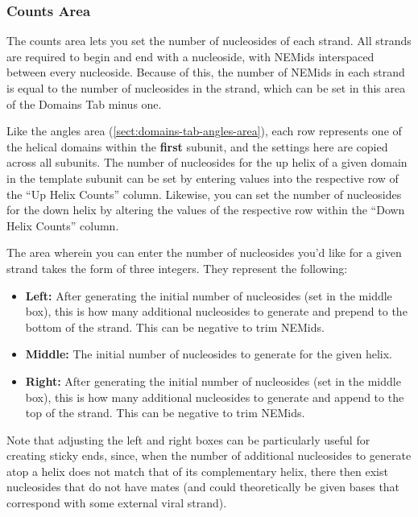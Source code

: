 \documentclass[titlepage]{article}
\begin{document}
\subsubsection{Counts Area}
\label{sect:domains-tab-counts-area}

The counts area lets you set the number of nucleosides of each strand. All strands are required to begin and end with a nucleoside, with NEMids interspaced between every nucleoside. Because of this, the number of NEMids in each strand is equal to the number of nucleosides in the strand, which can be set in this area of the Domains Tab minus one. 

Like the angles area (\ref{sect:domains-tab-angles-area}), each row represents one of the helical domains within the \textbf{first} subunit, and the settings here are copied across all subunits. The number of nucleosides for the up helix of a given domain in the template subunit can be set by entering values into the respective row of the ``Up Helix Counts'' column. Likewise, you can set the number of nucleosides for the down helix by altering the values of the respective row within the ``Down Helix Counts'' column.

The area wherein you can enter the number of nucleosides you'd like for a given strand takes the form of three integers. They represent the following:

\begin{itemize}
	\item \textbf{Left:} After generating the initial number of nucleosides (set in the middle box), this is how many additional nucleosides to generate and prepend to the bottom of the strand. This can be negative to trim NEMids.
	
	\item \textbf{Middle:} The initial number of nucleosides to generate for the given helix.
	
	\item \textbf{Right:} After generating the initial number of nucleosides (set in the middle box), this is how many additional nucleosides to generate and append to the top of the strand. This can be negative to trim NEMids.
\end{itemize}

Note that adjusting the left and right boxes can be particularly useful for creating sticky ends, since, when the number of additional nucleosides to generate atop a helix does not match that of its complementary helix, there then exist nucleosides that do not have mates (and could theoretically be given bases that correspond with some external viral strand).
\end{document}
